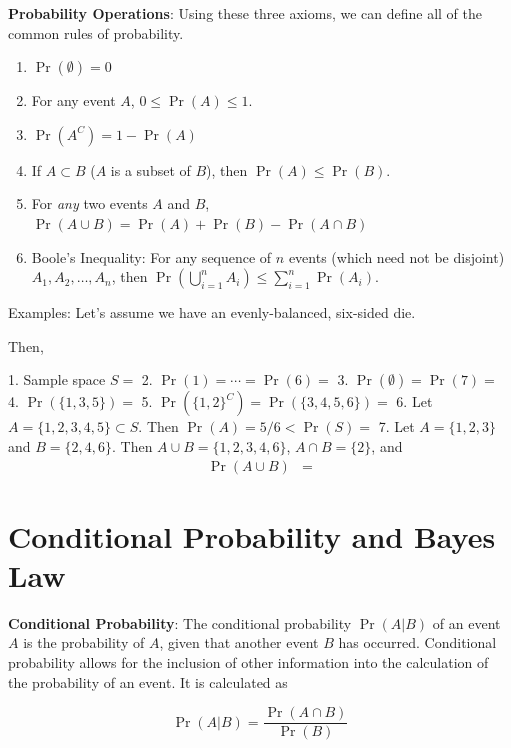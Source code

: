 \documentclass[]{book}
\providecommand{\tightlist}{%
  \setlength{\itemsep}{0pt}\setlength{\parskip}{0pt}}
\theoremstyle{definition}
\theoremstyle{definition}
\theoremstyle{definition}
\theoremstyle{remark}
\begin{document}
\textbf{Probability Operations}: Using these three axioms, we can define
all of the common rules of probability.

\begin{enumerate}
\def\labelenumi{\arabic{enumi}.}
\tightlist
\item
  \(\Pr(\emptyset)=0\)
\item
  For any event \(A\), \(0\le \Pr(A) \le 1\).
\item
  \(\Pr({A}^C)=1-\Pr(A)\)
\item
  If \(A\subset B\) (\(A\) is a subset of \(B\)), then
  \(\Pr(A)\le \Pr(B)\).
\item
  For \textit{any} two events \(A\) and \(B\),
  \(\Pr(A\cup B)=\Pr(A)+\Pr(B)-\Pr(A\cap B)\)
\item
  Boole's Inequality: For any sequence of \(n\) events (which need not
  be disjoint) \(A_1,A_2,\ldots,A_n\), then
  \(\Pr\left( \bigcup\limits_{i=1}^n A_i\right) \leq \sum\limits_{i=1}^n \Pr(A_i)\).
\end{enumerate}

\begin{framed}
Examples:  Let's assume we have an evenly-balanced, six-sided die.

Then,

1. Sample space $S=$ %
2. $\Pr(1)=\cdots=\Pr(6)=$
3. $\Pr(\emptyset)=\Pr(7)=$
4.  $\Pr\left( \{ 1, 3, 5 \} \right)=$
5. $\Pr\left( \{ 1, 2 \}^C \right)= \Pr\left( \{ 3, 4, 5, 6 \}\right)=$
6. Let $A=\{ 1,2,3,4,5 \}\subset S$.  Then $\Pr(A)=5/6<\Pr(S)=$ 
7.  Let $A=\{ 1, 2, 3 \}$ and $B=\{ 2, 4, 6 \}$.  Then $A\cup B=\{
1, 2, 3, 4, 6\}$, $A\cap B=\{2\}$, and
\begin{eqnarray}
  \Pr(A\cup B)&=
\end{eqnarray}
\end{framed}

\section{Conditional Probability and Bayes
Law}\label{conditional-probability-and-bayes-law}

\textbf{Conditional Probability}: The conditional probability
\(\Pr(A|B)\) of an event \(A\) is the probability of \(A\), given that
another event \(B\) has occurred. Conditional probability allows for the
inclusion of other information into the calculation of the probability
of an event. It is calculated as

\[\Pr(A|B)=\frac{\Pr(A\cap B)}{\Pr(B)}\]
\end{document}
